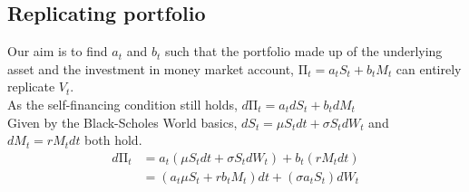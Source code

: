 \subsection{Replicating portfolio}

Our aim is to find $a_{t}$ and $b_{t}$ such that the portfolio made up of the underlying asset and the investment in money market account, $\mathrm{\Pi}_{t} = a_{t}S_{t} + b_{t}M_{t}$ can entirely replicate $V_{t}$.\\[2mm]
As the self-financing condition still holds, $\displaystyle d\mathrm{\Pi}_{t} = a_{t}dS_{t} + b_{t}dM_{t}$\\
Given by the Black-Scholes World basics, $\displaystyle dS_{t} = \mu S_{t}dt + \sigma S_{t}dW_{t}$ and $\displaystyle dM_{t}  = rM_{t}dt$ both hold.\\
\begin{equation*}
\begin{split}
d\mathrm{\Pi}_{t} 
&= a_{t}(\mu S_{t}dt + \sigma S_{t}dW_{t}) + b_{t}(rM_{t}dt)\\
&= (a_{t}\mu S_{t} + rb_{t}M_{t})dt + (\sigma a_{t}S_{t})dW_{t}\\
\end{split}
\end{equation*}

